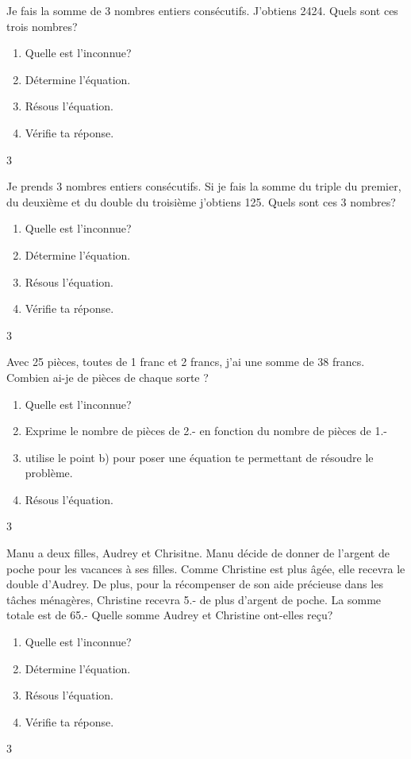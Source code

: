 \documentclass[a4paper,11pt]{report}
\begin{document}
\begin{exo}
{ Je fais la somme de 3 nombres entiers consécutifs. J'obtiens 2424. Quels sont ces trois nombres?\begin{enumerate}
    \item Quelle est l'inconnue?
    \item Détermine l'équation.
    \item Résous l'équation.
    \item Vérifie ta réponse.
\end{enumerate}}
{3}
\end{exo}

\begin{exo}
{Je prends 3 nombres entiers consécutifs. Si je fais la somme du triple du premier, du deuxième et du double du troisième j'obtiens 125. Quels sont ces 3 nombres?\begin{enumerate}
    \item Quelle est l'inconnue?
    \item Détermine l'équation.
    \item Résous l'équation.
    \item Vérifie ta réponse.
\end{enumerate}}
{3}
\end{exo}

\begin{exo}
  {Avec 25 pièces, toutes de 1 franc et 2 francs, j'ai une somme de 38 francs.
Combien ai-je de pièces de chaque sorte ?
\begin{enumerate}
    \item Quelle est l'inconnue?
    \item Exprime le nombre de pièces de 2.- en fonction du nombre de pièces de 1.-
    \item utilise le point b) pour poser une équation te permettant de résoudre le problème.
    \item Résous l'équation.
\end{enumerate}

}
 {3} 
\end{exo}


\begin{exo}
  {Manu a deux filles, Audrey et Chrisitne. Manu décide de donner de l'argent de poche pour les vacances à ses filles. Comme Christine est plus âgée, elle recevra le double d'Audrey. De plus, pour la récompenser de son aide précieuse dans les tâches ménagères, Christine recevra 5.- de plus d'argent de poche. 
  La somme totale est de 65.-
  Quelle somme Audrey et Christine ont-elles reçu?
\begin{enumerate}
 \item Quelle est l'inconnue?
    \item Détermine l'équation.
    \item Résous l'équation.
    \item Vérifie ta réponse.
\end{enumerate}

}
 {3} 
\end{exo}


\end{document}
